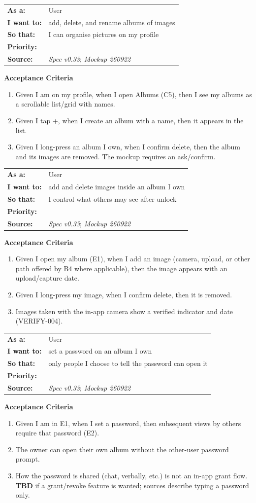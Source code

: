 \documentclass[11pt,a4paper]{article}
\makeatletter
\newcommand{\priPzero}{\colorbox{p0}{\makebox[4.6em]{\textcolor{white}{\scriptsize\bfseries P0 V1}}}}
\newcommand{\srcSpec}{\textit{Spec v0.33}}
\newcommand{\srcMock}{\textit{Mockup 260922}}
\newenvironment{story}[1]{%
  \Needspace{10\baselineskip}%
  \vspace{0.7em}%
  \noindent
  \colorbox{navy}{\makebox[\dimexpr\textwidth-2\fboxsep\relax][l]{\textcolor{white}{\bfseries\ #1}}}%
  \par\vspace{0.35em}%
}{\par\vspace{0.55em}}
\newcommand{\storymeta}[5]{%
  \noindent
  \begin{tabularx}{\textwidth}{@{}>{\bfseries}l X@{}}
    As a: & #1 \\
    I want to: & #2 \\
    So that: & #3 \\
    Priority: & #4 \\
    Source: & #5 \\
  \end{tabularx}
  \par\vspace{0.3em}
}
\newcommand{\achead}{\noindent\textbf{Acceptance Criteria}\par}
\makeatother
\begin{document}
\begin{story}{PROF-011 --- Photo albums --- create, rename, list}
\storymeta{User}{add, delete, and rename albums of images}{I can organise pictures on my profile}{\priPzero}{\srcSpec; \srcMock}
\achead
\begin{enumerate}
  \item Given I am on my profile, when I open Albums (C5), then I see my albums as a scrollable list/grid with names.
  \item Given I tap +, when I create an album with a name, then it appears in the list.
  \item Given I long-press an album I own, when I confirm delete, then the album and its images are removed. The mockup requires an ask/confirm.
\end{enumerate}
\end{story}

\begin{story}{PROF-012 --- Album images --- add and delete}
\storymeta{User}{add and delete images inside an album I own}{I control what others may see after unlock}{\priPzero}{\srcSpec; \srcMock}
\achead
\begin{enumerate}
  \item Given I open my album (E1), when I add an image (camera, upload, or other path offered by B4 where applicable), then the image appears with an upload/capture date.
  \item Given I long-press my image, when I confirm delete, then it is removed.
  \item Images taken with the in-app camera show a verified indicator and date (VERIFY-004).
\end{enumerate}
\end{story}

\begin{story}{PROF-013 --- Lock an album with a password}
\storymeta{User}{set a password on an album I own}{only people I choose to tell the password can open it}{\priPzero}{\srcSpec; \srcMock}
\achead
\begin{enumerate}
  \item Given I am in E1, when I set a password, then subsequent views by others require that password (E2).
  \item The owner can open their own album without the other-user password prompt.
  \item How the password is shared (chat, verbally, etc.) is not an in-app grant flow. \textbf{TBD} if a grant/revoke feature is wanted; sources describe typing a password only.
\end{enumerate}
\end{story}
\end{document}
